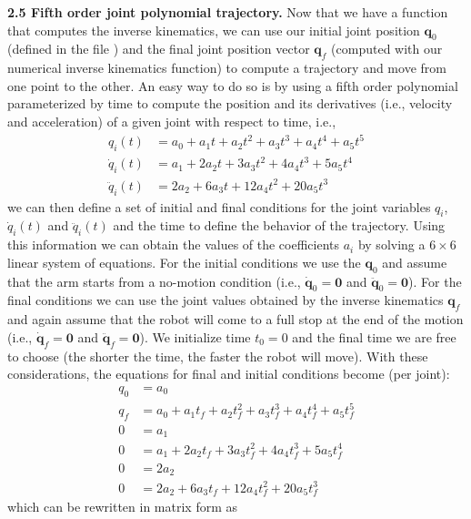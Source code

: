 \documentclass[11pt]{article}
\begin{document}
\textbf{2.5 Fifth order joint polynomial trajectory.} Now that we have a function that computes the inverse kinematics, we can use our initial joint position $\mathbf{q}_0$(defined in the file ) and the final joint position vector $\mathbf{q}_f$ (computed with our numerical inverse kinematics function) to compute a trajectory and move from one point to the other. An easy way to do so is by using a fifth order polynomial parameterized by time to compute the position and its derivatives (i.e., velocity and acceleration) of a given joint with respect to time, i.e.,
\begin{align*}
	q_i(t) &= a_0  + a_1 t +  a_2 t^2 + a_3 t^3 + a_4 t^4 + a_5 t^5\\
	\dot{q}_i(t) &= a_1 + 2 a_2 t + 3a_3 t^2 + 4 a_4 t^3 + 5 a_5 t^4\\
	\ddot{q}_i(t) &= 2 a_2 + 6 a_3 t + 12 a_4 t^2 + 20 a_5 t^3
\end{align*} 
we can then define a set of initial and final conditions for the joint variables $q_i$, $\dot{q}_i(t)$ and $\ddot{q}_i(t)$ and the time to define the behavior of the trajectory. Using this information we can obtain the values of the coefficients $a_i$ by solving a $6\times 6$ linear system of equations. For the initial conditions we use the $\mathbf{q}_0$ and assume that the arm starts from a no-motion condition (i.e., $\dot{\mathbf{q}}_0 = \mathbf{0}$ and $\ddot{\mathbf{q}}_0 = \mathbf{0}$). For the final conditions we can use the joint values obtained by the inverse kinematics $\mathbf{q}_f$ and again assume that the robot will come to a full stop at the end of the motion (i.e., $\dot{\mathbf{q}}_f = \mathbf{0}$ and $\ddot{\mathbf{q}}_f = \mathbf{0}$). We initialize time $t_0 = 0$ and the final time we are free to choose (the shorter the time, the faster the robot will move). With these considerations, the equations for final and initial conditions become (per joint):
\begin{align*}
	q_0 &= a_0  \\
	q_f &= a_0  + a_1 t_f +  a_2 t_f^2 + a_3 t_f^3 + a_4 t_f^4 + a_5 t_f^5\\
	0 &= a_1 \\
	0 &= a_1 + 2 a_2 t_f + 3a_3 t_f^2 + 4 a_4 t_f^3 + 5 a_5 t_f^4\\
	0 &= 2 a_2 \\
	0 &= 2 a_2 + 6 a_3 t_f + 12 a_4 t_f^2 + 20 a_5 t_f^3
\end{align*}
which can be rewritten in matrix form as
\end{document}
